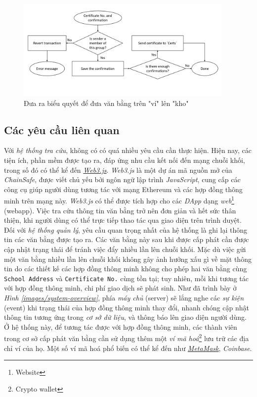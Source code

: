 \begin{figure}[!ht]
    \centering
    \includegraphics[width=400px]{images/multisig-confirm-cert.png}
    \caption{Đưa ra biểu quyết để đưa văn bằng trên "ví" lên "kho"}
\end{figure}


\subsection{Các yêu cầu liên quan}
Với \textit{hệ thống tra cứu}, không có có quá nhiều yêu cầu cần thực hiện. Hiện nay, các tiện ích, phần mềm được tạo ra, đáp ứng nhu cầu kết nối đến mạng chuỗi khối, trong số đó có thể kể đến \href{https://github.com/ChainSafe/web3.js}{\textit{Web3.js}}. \textit{Web3.js} là một dự án mã nguồn mở của \textit{ChainSafe}, được viết chủ yếu bởi ngôn ngữ lập trình \textit{JavaScript}, cung cấp các công cụ giúp người dùng tương tác với mạng Ethereum và các hợp đồng thông minh trên mạng này. \textit{Web3.js} có thể được tích hợp cho các \textit{DApp} dạng \textit{web}\footnote{Website} (webapp). Việc tra cứu thông tin văn bằng trở nên đơn giản và hết sức thân thiện, khi người dùng có thể trực tiếp thao tác qua giao diện trên trình duyệt.\\

Đối với \textit{hệ thống quản lý}, yêu cầu quan trọng nhất của hệ thống là ghi lại thông tin các văn bằng được tạo ra. Các văn bằng này sau khi được cấp phát cần được cập nhật trạng thái để tránh việc đẩy nhiều lần lên chuỗi khối. Mặc dù việc gửi một văn bằng nhiều lần lên chuỗi khối không gây ảnh hưởng xấu gì về mặt thông tin do các thiết kế các hợp đồng thông minh không cho phép hai văn bằng cùng \texttt{School Address} và \texttt{Certificate No.} cùng tồn tại; tuy nhiên, mỗi khi tương tác với hợp đồng thông minh, chi phí giao dịch sẽ phát sinh. Như đã trình bày ở \textit{Hình \ref{images/system-overview}}, phía \textit{máy chủ} (server) sẽ lắng nghe các \textit{sự kiện} (event) khi trạng thái của hợp đồng thông minh thay đổi, nhanh chóng cập nhật thông tin tương ứng trong \textit{cơ sở dữ liệu}, và thông báo lên giao diện người dùng. Ở hệ thống này, để tương tác được với hợp đồng thông minh, các thành viên trong cơ sở cấp phát văn bằng cần sử dụng thêm một \textit{ví mã hoá}\footnote{Crypto wallet} lưu trữ các địa chỉ ví của họ. Một số ví mã hoá phổ biến có thể kể đến như \href{https://metamask.io/}{\textit{MetaMask}}, \textit{Coinbase}.\\

